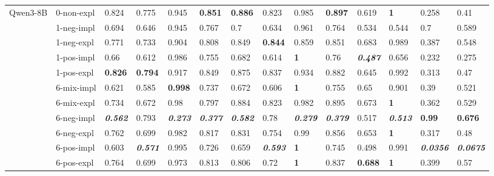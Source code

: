\begin{tabular}{ll|llll|llll|llll}
\midrule
\multirow[t]{11}{*}{Qwen3-8B} & 0-non-expl & 0.824 & 0.775 & 0.945 & \bfseries 0.851 & \bfseries 0.886 & 0.823 & 0.985 & \bfseries 0.897 & 0.619 & \bfseries 1 & 0.258 & 0.41 \\
 & 1-neg-impl & 0.694 & 0.646 & 0.945 & 0.767 & 0.7 & 0.634 & 0.961 & 0.764 & 0.534 & 0.544 & 0.7 & 0.589 \\
 & 1-neg-expl & 0.771 & 0.733 & 0.904 & 0.808 & 0.849 & \bfseries 0.844 & 0.859 & 0.851 & 0.683 & 0.989 & 0.387 & 0.548 \\
 & 1-pos-impl & 0.66 & 0.612 & 0.986 & 0.755 & 0.682 & 0.614 & \bfseries 1 & 0.76 & \bfseries \itshape 0.487 & 0.656 & 0.232 & 0.275 \\
 & 1-pos-expl & \bfseries 0.826 & \bfseries 0.794 & 0.917 & 0.849 & 0.875 & 0.837 & 0.934 & 0.882 & 0.645 & 0.992 & 0.313 & 0.47 \\
 & 6-mix-impl & 0.621 & 0.585 & \bfseries 0.998 & 0.737 & 0.672 & 0.606 & \bfseries 1 & 0.755 & 0.65 & 0.901 & 0.39 & 0.521 \\
 & 6-mix-expl & 0.734 & 0.672 & 0.98 & 0.797 & 0.884 & 0.823 & 0.982 & 0.895 & 0.673 & \bfseries 1 & 0.362 & 0.529 \\
 & 6-neg-impl & \bfseries \itshape 0.562 & 0.793 & \bfseries \itshape 0.273 & \bfseries \itshape 0.377 & \bfseries \itshape 0.582 & 0.78 & \bfseries \itshape 0.279 & \bfseries \itshape 0.379 & 0.517 & \bfseries \itshape 0.513 & \bfseries 0.99 & \bfseries 0.676 \\
 & 6-neg-expl & 0.762 & 0.699 & 0.982 & 0.817 & 0.831 & 0.754 & 0.99 & 0.856 & 0.653 & \bfseries 1 & 0.317 & 0.48 \\
 & 6-pos-impl & 0.603 & \bfseries \itshape 0.571 & 0.995 & 0.726 & 0.659 & \bfseries \itshape 0.593 & \bfseries 1 & 0.745 & 0.498 & 0.991 & \bfseries \itshape 0.0356 & \bfseries \itshape 0.0675 \\
 & 6-pos-expl & 0.764 & 0.699 & 0.973 & 0.813 & 0.806 & 0.72 & \bfseries 1 & 0.837 & \bfseries 0.688 & \bfseries 1 & 0.399 & 0.57 \\
\bottomrule
\end{tabular}
